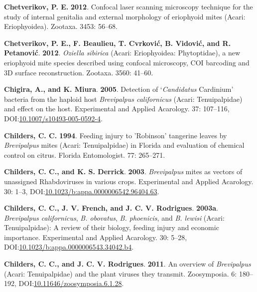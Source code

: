 \documentclass[12pt,final,CPage]{ufthesis}
\newlength{\cslhangindent}
\newenvironment{CSLReferences}[2] %
{%
	\setlength{\parindent}{0pt}
	\ifodd #1 \everypar{\setlength{\hangindent}{\cslhangindent}}\ignorespaces\fi
	\ifnum #2 > 0
	\setlength{\parskip}{#2\baselineskip}
	\fi
}%
{}
\begin{document}
{\begin{CSLReferences}{1}{0}
  \leavevmode{}%
  \textbf{Chetverikov, P. E.} \textbf{2012}. Confocal laser scanning microscopy technique for the study of internal genitalia and external morphology of eriophyoid mites ({Acari}: {Eriophyoidea}). Zootaxa. 3453: 56--68.

  \leavevmode{}%
  \textbf{Chetverikov, P. E., F. Beaulieu, T. Cvrković, B. Vidović, and R. Petanović}. \textbf{2012}. {\emph{Oziella sibirica}} ({Acari}: {Eriophyoidea}: {Phytoptidae}), a new eriophyoid mite species described using confocal microscopy, {COI} barcoding and {3D} surface reconstruction. Zootaxa. 3560: 41--60.

  \leavevmode{}%
  \textbf{Chigira, A., and K. Miura}. \textbf{2005}. Detection of {`{\emph{Candidatus}} {Cardinium}'} bacteria from the haploid host {\emph{Brevipalpus californicus}} ({Acari}: {Tenuipalpidae}) and effect on the host. Experimental and Applied Acarology. 37: 107--116, DOI:\href{https://doi.org/10.1007/s10493-005-0592-4}{10.1007/s10493-005-0592-4}.

  \leavevmode{}%
  \textbf{Childers, C. C.} \textbf{1994}. Feeding injury to {'Robinson'} tangerine leaves by {\emph{Brevipalpus}} mites ({Acari}: {Tenuipalpidae}) in {Florida} and evaluation of chemical control on citrus. Florida Entomologist. 77: 265--271.

  \leavevmode{}%
  \textbf{Childers, C. C., and K. S. Derrick}. \textbf{2003}. {\emph{Brevipalpus}} mites as vectors of unassigned {Rhabdoviruses} in various crops. Experimental and Applied Acarology. 30: 1--3, DOI:\href{https://doi.org/10.1023/b:appa.0000006542.96404.63}{10.1023/b:appa.0000006542.96404.63}.

  \leavevmode{}%
  \textbf{Childers, C. C., J. V. French, and J. C. V. Rodrigues}. \textbf{2003a}. {\emph{Brevipalpus californicus}}, {\emph{B. obovatus}}, {\emph{B. phoenicis}}, and {\emph{B. lewisi}} ({Acari}: {Tenuipalpidae}): A review of their biology, feeding injury and economic importance. Experimental and Applied Acarology. 30: 5--28, DOI:\href{https://doi.org/10.1023/b:appa.0000006543.34042.b4}{10.1023/b:appa.0000006543.34042.b4}.

  \leavevmode{}%
  \textbf{Childers, C. C., and J. C. V. Rodrigues}. \textbf{2011}. An overview of {\emph{Brevipalpus}} ({Acari}: {Tenuipalpidae}) and the plant viruses they transmit. Zoosymposia. 6: 180--192, DOI:\href{https://doi.org/10.11646/zoosymposia.6.1.28}{10.11646/zoosymposia.6.1.28}.


\end{CSLReferences}}
\end{document}

